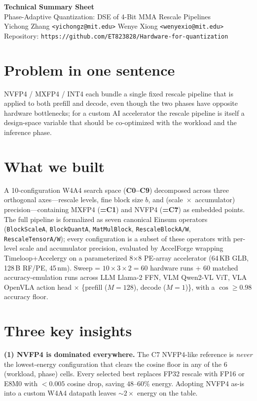 \documentclass[10pt]{article}
\begin{document}
\begin{center}
{\Large\bfseries Technical Summary Sheet}\\[2pt]
{\large Phase-Adaptive Quantization: DSE of 4-Bit MMA Rescale Pipelines}\\[1pt]
{\small Yichong Zhang \texttt{<yichongz@mit.edu>} \quad\textbar\quad
        Wenye Xiong \texttt{<wenyexio@mit.edu>}}\\[1pt]
{\small Repository: \texttt{https://github.com/ET823828/Hardware-for-quantization}}
\end{center}

\section*{Problem in one sentence}
NVFP4 / MXFP4 / INT4 each bundle a single fixed rescale pipeline that
is applied to both prefill and decode, even though the two phases
have opposite hardware bottlenecks; for a custom AI accelerator the
rescale pipeline is itself a design-space variable that should be
co-optimized with the workload and the inference phase.

\section*{What we built}
A 10-configuration W4A4 search space (\textbf{C0--C9}) decomposed
across three orthogonal axes---rescale levels, fine block size $b$,
and (scale~$\times$~accumulator) precision---containing MXFP4 (\textbf{=C1}) and
NVFP4 (\textbf{=C7}) as embedded points.  The full pipeline is
formalized as seven canonical Einsum operators
(\texttt{BlockScaleA}, \texttt{BlockQuantA}, \texttt{MatMulBlock},
\texttt{RescaleBlockA/W}, \texttt{RescaleTensorA/W}); every
configuration is a subset of these operators with per-level scale
and accumulator precision, evaluated by AccelForge wrapping
Timeloop+Accelergy on a parameterized 8$\times$8 PE-array
accelerator (64\,KB GLB, 128\,B RF/PE, 45\,nm).  Sweep =
$10\!\times\!3\!\times\!2 = 60$ hardware runs + $60$ matched
accuracy-emulation runs across LLM Llama-2 FFN, VLM Qwen2-VL ViT,
VLA OpenVLA action head $\times$ \{prefill ($M{=}128$), decode
($M{=}1$)\}, with a $\cos\!\geq\!0.98$ accuracy floor.

\section*{Three key insights}

\textbf{(1) NVFP4 is dominated everywhere.}
The C7 NVFP4-like reference is \emph{never} the lowest-energy
configuration that clears the cosine floor in any of the 6
(workload, phase) cells.  Every selected best replaces FP32
rescale with FP16 or E8M0 with $<0.005$ cosine drop, saving
$48$--$60\%$ energy.  Adopting NVFP4 as-is into a custom W4A4
datapath leaves $\sim2\!\times$ energy on the table.
\end{document}
